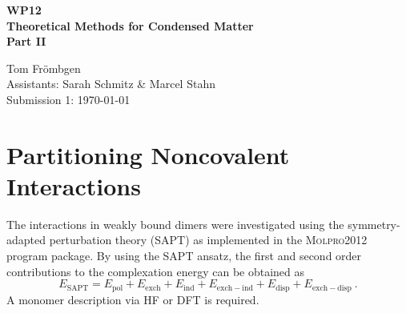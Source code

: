 \documentclass[a4paper,12pt]{scrartcl}
\newcommand{\m}[1]{\mathrm{#1}}
\begin{document}
%
\thispagestyle{empty}

%
\begin{center}
	\begin{LARGE}
		\vspace{50mm}
		\textbf{WP12} \\
		\vspace{15mm}
		\textbf{Theoretical Methods for Condensed Matter} \\
		\vspace{15mm}
		\textbf{Part II} \\
		\vspace{30mm}
	\end{LARGE}
	\begin{large}
		Tom Frömbgen \\
		\vspace{20mm}
		Assistants: Sarah Schmitz \& Marcel Stahn  \\
		\vspace{10mm}
		Submission 1: \today \\
		\vspace{5mm}
	\end{large}
\end{center}

%
%
\newpage
{}
\section{Partitioning Noncovalent Interactions}
%
The interactions in weakly bound dimers were investigated using the symmetry-adapted perturbation theory\autocite{sapt} (SAPT) as implemented in the \textsc{Molpro2012} program package\autocite[]{molpro2012-brief}. By using the SAPT ansatz, the first and second order contributions to the complexation energy can be obtained as
%
\begin{equation}
	E_\m{SAPT} = E_\m{pol} + E_\m{exch} + E_\m{ind} + E_\m{exch-ind} + E_\m{disp} + E_\m{exch-disp}~.
\end{equation}
%
A monomer description via HF or DFT is required.
%
\end{document}
